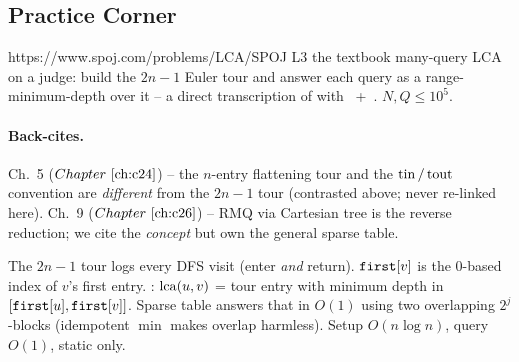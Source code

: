 \subsection{Practice Corner}

\begin{practiceset}
    {https://www.spoj.com/problems/LCA/}{SPOJ L3}
    {the textbook many-query LCA on a judge: build the \(2n\!-\!1\) Euler
     tour and answer each query as a range-minimum-depth over it -- a
     direct transcription of  with
     ~+~.  \(N,Q \le 10^{5}\).}
\end{practiceset}

\paragraph{Back-cites.}
Ch.~5 (\(\chref{c24}\)) -- the \(n\)-entry flattening tour and the
\(\operatorname{tin}/\operatorname{tout}\) convention are \emph{different} from the \(2n\!-\!1\) tour
(contrasted above; never re-linked here).
Ch.~9 (\(\chref{c26}\)) -- RMQ via Cartesian tree is the reverse
reduction; we cite the \emph{concept} but own the general sparse table.

\begin{recallbox}
The \(2n\!-\!1\) tour logs every DFS visit (enter \emph{and} return).
\(\texttt{first}[v]\) is the 0-based index of \(v\)'s first entry.
: \(\operatorname{lca}(u,v)\) = tour entry with minimum depth in
\([\texttt{first}[u], \texttt{first}[v]]\).  Sparse table answers that in
\(O(1)\) using two overlapping \(2^j\)-blocks (idempotent \(\min\) makes
overlap harmless).  Setup \(O(n\log n)\), query \(O(1)\), static only.
\end{recallbox}
